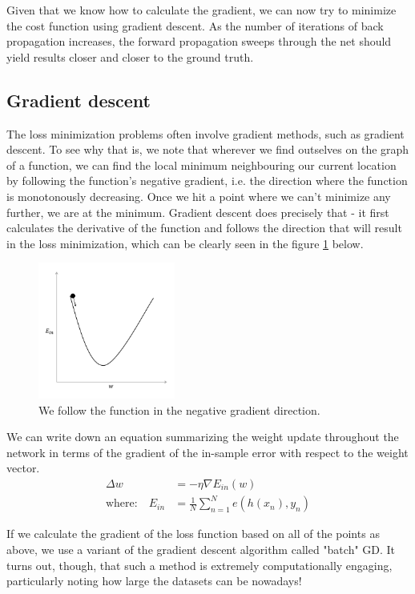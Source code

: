 \documentclass[a4paper, 11pt]{article}
\numberwithin{equation}{section}
\begin{document}
	Given that we know how to calculate the gradient, we can now try to minimize the cost function using gradient descent. As the number of iterations of back propagation increases, the forward propagation sweeps through the net should yield results closer and closer to the ground truth.
	
	\subsection{Gradient descent}
	The loss minimization problems often involve gradient methods, such as gradient descent. To see why that is, we note that wherever we find outselves on the graph of a function, we can find the local minimum neighbouring our current location by following the function's negative gradient, i.e. the direction where the function is monotonously decreasing. Once we hit a point where we can't minimize any further, we are at the minimum. Gradient descent does precisely that - it first calculates the derivative of the function and follows the direction that will result in the loss minimization, which can be clearly seen in the figure \ref{fig:graddesc} below.
	
	\begin{figure}[!h]
		\centering
		\includegraphics[page=1,width=0.40\textwidth]{graddesc.pdf}
		\caption{\label{fig:graddesc}{We follow the function in the negative gradient direction.}}
	\end{figure}
	
	We can write down an equation summarizing the weight update throughout the network in terms of the gradient of the in-sample error with respect to the weight vector.
	\begin{align}
	\Delta w &= - \eta \nabla E_{in}(w) \\
	\textrm{where:} \quad E_{in} &= \frac{1}{N} \sum_{n = 1}^{N} e(h(x_n), y_n)
	\end{align}
	
	If we calculate the gradient of the loss function based on all of the points as above, we use a variant of the gradient descent algorithm called "batch" GD. It turns out, though, that such a method is extremely computationally engaging, particularly noting how large the datasets can be nowadays!
	
\end{document}
